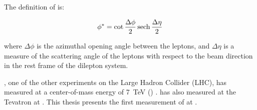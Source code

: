 The definition of \phistar is:

\begin{equation}\label{eq:phistar}
    \phi^{*} = \cot \frac{\Delta \phi}{2} \operatorname{sech} \frac{\Delta \eta}{2}
\end{equation}

where $\Delta \phi$ is the azimuthal opening angle between the leptons, and
$\Delta \eta$ is a measure of the scattering angle of the leptons with respect
to the beam direction in the rest frame of the dilepton system.

\ATLAS, one of the other experiments on the Large Hadron Collider (LHC), has
measured \phistar at a center-of-mass energy of \SI{7}{\TeV} (\rootsseven)
\cite{atlas_phistar}. \DZERO has also measured \phistar at the Tevatron at
\rootsTevatron \cite{d0_phistar_2011,d0_phistar_2014}. This thesis presents the
first measurement of \phistar at \rootseight.

